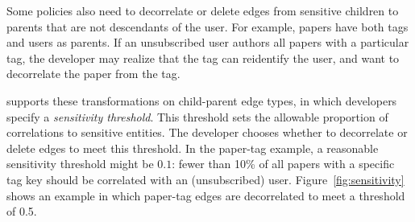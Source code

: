 Some policies also need to decorrelate or delete edges from sensitive children to parents that are
not descendants of the user. For example, papers have both tags and users as parents. If an
unsubscribed user authors all papers with a particular tag, the developer may realize that the tag
can reidentify the user, and want to decorrelate the paper from the tag.

\sys supports these transformations on child-parent edge types, in which developers specify  a
\emph{sensitivity threshold}. This threshold sets the allowable proportion of correlations to
sensitive entities. The developer chooses whether to decorrelate or delete edges to meet this
threshold. In the paper-tag example, a reasonable sensitivity threshold might be $0.1$: fewer than
10\% of all papers with a specific tag key should be correlated with an (unsubscribed) user.
Figure~\ref{fig:sensitivity} shows an example in which paper-tag edges are decorrelated to meet a
threshold of 0.5.


